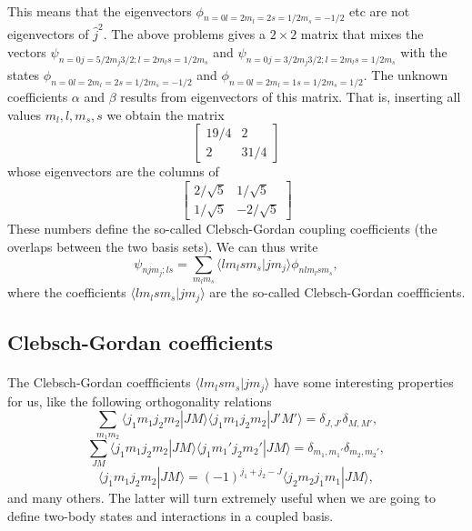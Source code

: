 \documentclass[%
twoside,                 %
final,                   %
10pt]{article}
\begin{document}
\paragraph{}
This means that the eigenvectors $\phi_{n=0l=2m_l=2s=1/2m_s=-1/2}$ etc are not eigenvectors of $\hat{j}^2$. The above problems gives a $2\times2$ matrix that mixes the vectors $\psi_{n=0j=5/2m_j3/2;l=2m_ls=1/2m_s}$ and $\psi_{n=0j=3/2m_j3/2;l=2m_ls=1/2m_s}$ with the states  $\phi_{n=0l=2m_l=2s=1/2m_s=-1/2}$ and
$\phi_{n=0l=2m_l=1s=1/2m_s=1/2}$. The unknown coefficients $\alpha$ and $\beta$ results from eigenvectors of this matrix. That is, inserting all values $m_l,l,m_s,s$ we obtain the matrix 
\[
\left[ \begin{array} {cc} 19/4 & 2 \\ 2 & 31/4 \end{array} \right]\]
whose eigenvectors are the columns of
\[
\left[ \begin{array} {cc} 2/\sqrt{5} &1/\sqrt{5}  \\ 1/\sqrt{5} & -2/\sqrt{5} \end{array}\right]\]  
These numbers define the so-called Clebsch-Gordan coupling coefficients  (the overlaps between the two basis sets). We can thus write
\[
\psi_{njm_j;ls}=\sum_{m_lm_s}\langle lm_lsm_s|jm_j\rangle\phi_{nlm_lsm_s},
\]
where the coefficients $\langle lm_lsm_s|jm_j\rangle$ are the so-called Clebsch-Gordan coeffficients.



\subsection*{Clebsch-Gordan coefficients}

\paragraph{}
The Clebsch-Gordan coeffficients $\langle lm_lsm_s|jm_j\rangle$ have some interesting properties for us, like the following  orthogonality relations
\[
\sum_{m_1m_2}\langle j_1m_1j_2m_2|JM\rangle\langle j_1m_1j_2m_2|J'M'\rangle=\delta_{J,J'}\delta_{M,M'},
\]
\[
\sum_{JM}\langle j_1m_1j_2m_2|JM\rangle\langle j_1m_1'j_2m_2'|JM\rangle=\delta_{m_1,m_1'}\delta_{m_2,m_2'},
\]
\[
\langle j_1m_1j_2m_2|JM\rangle=(-1)^{j_1+j_2-J}\langle j_2m_2j_1m_1|JM\rangle,
\]
and many others. The latter will turn extremely useful when we are going to define two-body states and interactions in a coupled basis.
\end{document}
